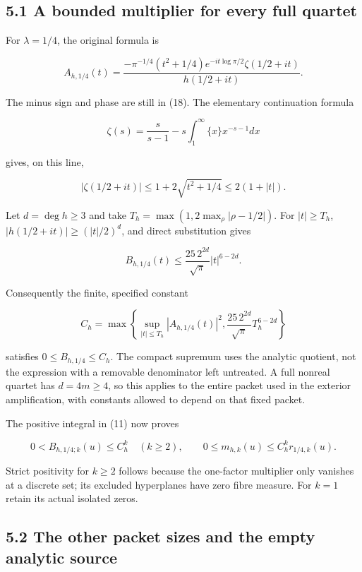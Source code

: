 \documentclass[
  11pt,
]{article}
\begin{document}
\subsection{5.1 A bounded multiplier for every full
quartet}\label{a-bounded-multiplier-for-every-full-quartet}

For \(\lambda=1/4\), the original formula is

\[
A_{h,1/4}(t)=
\frac{-\pi^{-1/4}(t^2+1/4)e^{-it\log\pi/2}\zeta(1/2+it)}{h(1/2+it)}.
                                                                    \tag{20}
\]

The minus sign and phase are still in (18). The elementary continuation
formula

\[
\zeta(s)=\frac{s}{s-1}-s\int_1^\infty\{x\}x^{-s-1}dx
\]

gives, on this line,

\[
|\zeta(1/2+it)|\le1+2\sqrt{t^2+1/4}\le2(1+|t|).
\]

Let \(d=\deg h\ge3\) and take \(T_h=\max(1,2\max_\rho|\rho-1/2|)\). For
\(|t|\ge T_h\), \(|h(1/2+it)|\ge(|t|/2)^d\), and direct substitution
gives

\[
B_{h,1/4}(t)\le\frac{25\,2^{2d}}{\sqrt\pi}|t|^{6-2d}.
\]

Consequently the finite, specified constant

\[
C_h=\max\left\{
\sup_{|t|\le T_h}|A_{h,1/4}(t)|^2,
\frac{25\,2^{2d}}{\sqrt\pi}T_h^{6-2d}
\right\}
\]

satisfies \(0\le B_{h,1/4}\le C_h\). The compact supremum uses the
analytic quotient, not the expression with a removable denominator left
untreated. A full nonreal quartet has \(d=4m\ge4\), so this applies to
the entire packet used in the exterior amplification, with constants
allowed to depend on that fixed packet.

The positive integral in (11) now proves

\[
\boxed{
0<B_{h,1/4;k}(u)\le C_h^k\quad(k\ge2),\qquad
0\le m_{h,k}(u)\le C_h^k r_{1/4,k}(u).
}                                                                   \tag{21}
\]

Strict positivity for \(k\ge2\) follows because the one-factor
multiplier only vanishes at a discrete set; its excluded hyperplanes
have zero fibre measure. For \(k=1\) retain its actual isolated zeros.

\subsection{5.2 The other packet sizes and the empty analytic
source}\label{the-other-packet-sizes-and-the-empty-analytic-source}
\end{document}
